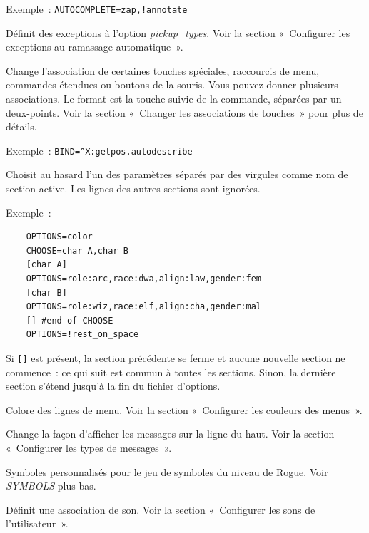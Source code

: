 \documentclass[titlepage]{article}
\begin{document}
\begin{description}
Exemple~:
\texttt{AUTOCOMPLETE=zap,!annotate}\\

\item[{AUTOPICKUP\_EXCEPTION}]
Définit des exceptions à l'option
\textit{pickup\_types}.
Voir la section «~Configurer les exceptions au ramassage
automatique~».

\item[{BINDINGS}]
Change l'association de certaines touches spéciales, raccourcis de menu,
commandes étendues ou boutons de la souris.
Vous pouvez donner plusieurs associations.
Le format est la touche suivie de la commande, séparées par un
deux-points.
Voir la section «~Changer les associations de touches~» pour plus de
détails.


Exemple~:
\texttt{BIND=\textasciicircum{}X:getpos.autodescribe}\\

\item[{CHOOSE}]
Choisit au hasard l'un des paramètres séparés par des virgules comme nom de
section active.
Les lignes des autres sections sont ignorées.


Exemple~:
\begin{verbatim}
    OPTIONS=color
    CHOOSE=char A,char B
    [char A]
    OPTIONS=role:arc,race:dwa,align:law,gender:fem
    [char B]
    OPTIONS=role:wiz,race:elf,align:cha,gender:mal
    [] #end of CHOOSE
    OPTIONS=!rest_on_space
\end{verbatim}


Si \texttt{[]} est présent, la section précédente se ferme et aucune
nouvelle section ne commence~: ce qui suit est commun à toutes les
sections.
Sinon, la dernière section s'étend jusqu'à la fin du fichier d'options.

\item[{MENUCOLOR}]
Colore des lignes de menu.
Voir la section «~Configurer les couleurs des menus~».

\item[{MSGTYPE}]
Change la façon d'afficher les messages sur la ligne du haut.
Voir la section «~Configurer les types de messages~».

\item[{ROGUESYMBOLS}]
Symboles personnalisés pour le jeu de symboles du niveau de Rogue.
Voir \textit{SYMBOLS} plus bas.

\item[{SOUND}]
Définit une association de son.
Voir la section «~Configurer les sons de l'utilisateur~».


\end{description}
\end{document}

